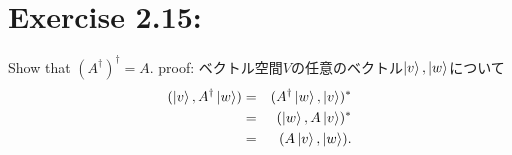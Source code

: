 \section{\Large Exercise 2.15:} Show that $(A^\dagger)^\dagger = A.$ 
\newline
{\large proof:}
ベクトル空間$V$の任意のベクトル$\ket{v}, \ket{w}$について
\begin{eqnarray*}
(\ket{v}, A^\dagger \ket{w}) 
&=& (A^\dagger \ket{w}, \ket{v})^* \\
&=& (\ket{w}, A\ket{v})^* \\
&=& (A\ket{v}, \ket{w}).
\end{eqnarray*}
